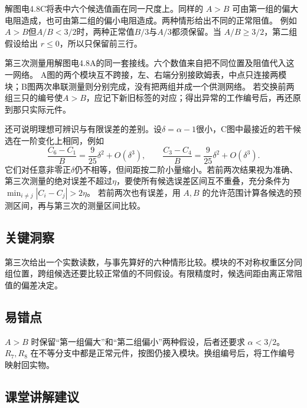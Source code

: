 \documentclass[UTF8,fontset=fandol,a4paper,11pt]{ctexart}
\begin{document}
解图电4.8C将表中六个候选值画在同一尺度上。同样的 $A>B$ 可由第一组的偏大电阻造成，也可由第二组的偏小电阻造成。两种情形给出不同的正常阻值。
例如$A>B$但$A/B<3/2$时，两种正常值$B/3$与$A/3$都须保留。当 $A/B\ge3/2$，第二组假设给出 $r\le0$，所以只保留前三行。

第三次测量用解图电4.8A的同一套接线。六个数值来自把不同位置及阻值代入这一网络。
A图的两个模块互不跨接，左、右端分别接欧姆表，中点只连接两模块；B图两次串联测量则分别完成，没有把两组并成一个供测网络。
若交换前两组三只的编号使$A>B$，应记下新旧标签的对应；得出异常的工作编号后，再还原到那只实际元件。

还可说明理想可辨识与有限误差的差别。设$\delta=\alpha-1$很小，C图中最接近的若干候选在一阶变化上相同，例如
\[
\frac{C_6-C_1}{B}=\frac9{25}\delta^2+O(\delta^3),\qquad
\frac{C_3-C_4}{B}=\frac9{25}\delta^2+O(\delta^3).
\]
它们对任意非零正$\delta$仍不相等，但间距按二阶小量缩小。若前两次结果视为准确、第三次测量的绝对误差不超过$\eta$，要使所有候选误差区间互不重叠，充分条件为$\min_{i\ne j}|C_i-C_j|>2\eta$。
若前两次也有误差，用 $A,B$ 的允许范围计算各候选的预测区间，再与第三次的测量区间比较。




\subsection*{关键洞察}

第三次给出一个实数读数，与事先算好的六种情形比较。模块的不对称权重区分同组位置，跨组候选还要比较正常值的不同假设。有限精度时，候选间距由离正常阻值的偏差决定。



\subsection*{易错点}

$A>B$ 时保留“第一组偏大”和“第二组偏小”两种假设，后者还要求 $\alpha<3/2$。$R_7,R_8$ 在不等分支中都是正常元件，按图仍接入模块。换组编号后，将工作编号映射回实物。



\subsection*{课堂讲解建议}
\end{document}
